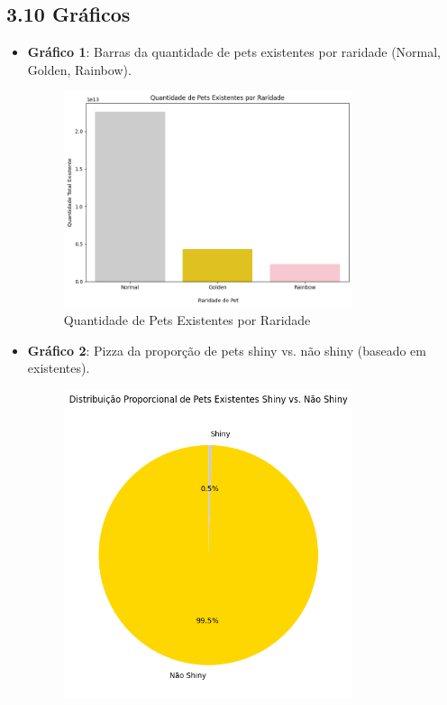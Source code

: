 \documentclass[12pt]{article}
\begin{document}
\subsection*{3.10 Gráficos}
\begin{itemize}
    \item \textbf{Gráfico 1}: Barras da quantidade de pets existentes por raridade (Normal, Golden, Rainbow).
     \begin{figure}[H]
         \centering
         \includegraphics[width=0.8\textwidth]{grafico1.png}
         \caption{Quantidade de Pets Existentes por Raridade}
     \end{figure}
    \item \textbf{Gráfico 2}: Pizza da proporção de pets shiny vs. não shiny (baseado em existentes).
     \begin{figure}[H]
         \centering
         \includegraphics[width=0.8\textwidth]{grafico2.png}

\end{figure}
\end{itemize}
\end{document}
